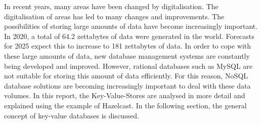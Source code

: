
In recent years, many areas have been changed by digitalisation. 
The digitalisation of areas has led to many changes and improvements. 
The possibilities of storing large amounts of data have become increasingly important. 
In 2020, a total of 64.2 zettabytes of data were generated in the world. 
Forecasts for 2025 expect this to increase to 181 zettabytes of data. 
In order to cope with these large amounts of data, new database management systems are constantly being developed and improved. 
However, rational databases such as MySQL are not suitable for storing this amount of data efficiently. 
For this reason, NoSQL database solutions are becoming increasingly important to deal with these data volumes. 
In this report, the Key-Value-Stores are analysed in more detail and explained using the example of Hazelcast. 
In the following section, the general concept of key-value databases is discussed. \parencite{data_development_2012_2025, Key_Value_Datastore}

